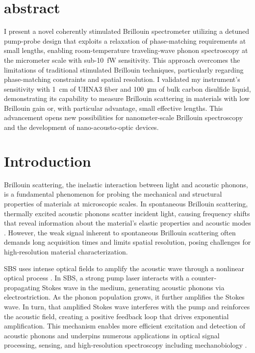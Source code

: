 
\section{abstract}
I present a novel coherently stimulated Brillouin spectrometer utilizing a detuned pump-probe design that exploits a relaxation of phase-matching requirements at small lengths, enabling room-temperature traveling-wave phonon spectroscopy at the micrometer scale with sub-\SI{10}{\femto\watt} sensitivity. This approach overcomes the limitations of traditional stimulated Brillouin techniques, particularly regarding phase-matching constraints and spatial resolution. I validated my instrument’s sensitivity with \SI{1}{\centi\meter} of \ac{UHNA3} fiber and \SI{100}{\micro\meter} of bulk carbon disulfide liquid, demonstrating its capability to measure Brillouin scattering in materials with low Brillouin gain or, with particular advantage, small effective lengths. This advancement opens new possibilities for nanometer-scale Brillouin spectroscopy and the development of nano-acousto-optic devices.

\section{Introduction}
\label{sec:Introduction}

Brillouin scattering, the inelastic interaction between light and acoustic phonons, is a fundamental phenomenon for probing the mechanical and structural properties of materials at microscopic scales. In spontaneous Brillouin scattering, thermally excited acoustic phonons scatter incident light, causing frequency shifts that reveal information about the material’s elastic properties and acoustic modes \cite{boyd2020nonlinear}. However, the weak signal inherent to spontaneous Brillouin scattering often demands long acquisition times and limits spatial resolution, posing challenges for high‐resolution material characterization.

\ac{SBS} uses intense optical fields to amplify the acoustic wave through a nonlinear optical process \cite{chiao1964stimulated}. In \ac{SBS}, a strong pump laser interacts with a counter‐propagating Stokes wave in the medium, generating acoustic phonons via electrostriction. As the phonon population grows, it further amplifies the Stokes wave. In turn, that amplified Stokes wave interferes with the pump and reinforces the acoustic field, creating a positive feedback loop that drives exponential amplification. This mechanism enables more efficient excitation and detection of acoustic phonons and underpins numerous applications in optical signal processing, sensing, and high‐resolution spectroscopy including mechanobiology \cite{eggleton2013inducing, fotiadi2023brillouin, kobyakov2009stimulated, ippen1972stimulated, speziale2014brillouin, palombo2019brillouin, dil1982brillouin, eggleton2019brillouin, prevedel2019brillouin, conrad2019mechanical}.

